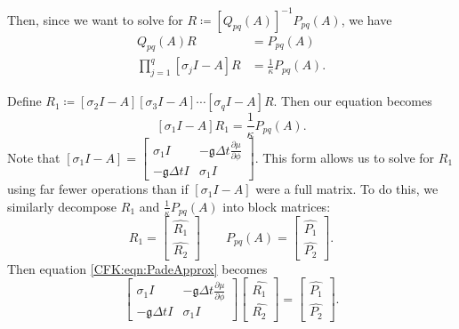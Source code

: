 \documentclass{csri19}
\newcommand{\CFKg}{\mathfrak{g}}
\begin{document}
Then, since we want to solve for 
$R \coloneqq \left[Q_{pq}(A)\right]^{-1}P_{pq}(A)$, we have
\begin{align*}
Q_{pq}(A) R &= P_{pq}(A)\\
\prod_{j=1}^q\left[\sigma_jI-A\right]R &= \frac{1}{\kappa}P_{pq}(A).
\end{align*}

Define $R_1 \coloneqq \left[\sigma_2I-A\right]\left[\sigma_3I-A\right]
\cdots\left[\sigma_qI-A\right]R$. Then our equation becomes
\begin{equation}\label{CFK:eqn:PadeApprox} \left[\sigma_1I-A\right]R_1 
= \frac{1}{\kappa}P_{pq}(A).\end{equation} Note that
$\left[\sigma_1I-A\right] =
 \begin{bmatrix} \sigma_1 I  & -\CFKg\Delta t \frac{\partial\mu}{\partial\phi} \\
 -\CFKg\Delta t I            & \sigma_1 I \end{bmatrix}.$ This form allows 
us to solve for $R_1$ using far fewer operations than if 
$\left[\sigma_1I-A\right]$ were a full matrix. To do this, we similarly 
decompose $R_1$ and $\frac{1}{\kappa}P_{pq}(A)$ into block matrices:
\[ R_1 = \begin{bmatrix} \hat{R_1} \\ \hat{R_2}\end{bmatrix} \qquad P_{pq}(A) = \begin{bmatrix} \hat{P_1} \\ \hat{P_2}\end{bmatrix}.\]
Then equation \ref{CFK:eqn:PadeApprox} becomes
\[\begin{bmatrix} \sigma_1 I  & -\CFKg\Delta t \frac{\partial\mu}{\partial\phi} \\
           -\CFKg\Delta t I & \sigma_1 I \end{bmatrix}
\begin{bmatrix} \hat{R_1} \\
 \hat{R_2} \end{bmatrix} = 
\begin{bmatrix} \hat{P_1} \\
 \hat{P_2} \end{bmatrix}.\]
\end{document}
